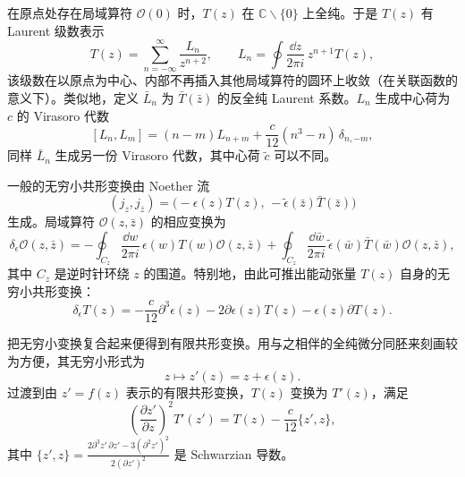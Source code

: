在原点处存在局域算符 $\mathcal{O}(0)$ 时，$T(z)$ 在 $\mathbb{C}\backslash\{0\}$ 上全纯。于是 $T(z)$ 有 Laurent 级数表示
\begin{equation}
  \label{eq:2-2}
  T(z)=\sum_{n=-\infty}^{\infty}\frac{L_n}{z^{n+2}},
  \qquad
  L_n=\oint\frac{\dd z}{2\pi i}\,z^{n+1}T(z),
\end{equation}
该级数在以原点为中心、内部不再插入其他局域算符的圆环上收敛（在关联函数的意义下）。类似地，定义 $\bar L_n$ 为 $\bar T(\bar z)$ 的反全纯 Laurent 系数。$L_n$ 生成中心荷为 $c$ 的 Virasoro 代数
\begin{equation}
  \label{eq:2-3}
  [L_n,L_m]=(n-m)L_{n+m}+\frac{c}{12}(n^3-n)\,\delta_{n,-m},
\end{equation}
同样 $\bar L_n$ 生成另一份 Virasoro 代数，其中心荷 $\tilde c$ 可以不同。


一般的无穷小共形变换由 Noether 流
\begin{equation}
  \label{eq:2-4}
  (j_z,j_{\bar z})=\bigl(-\epsilon(z)T(z),\,-\tilde\epsilon(\bar z)\bar T(\bar z)\bigr)
\end{equation}
生成。局域算符 $\mathcal{O}(z,\bar z)$ 的相应变换为
\begin{equation}
  \label{eq:2-5}
  \delta_\epsilon\mathcal{O}(z,\bar z)
  =-\oint_{C_z}\frac{\dd w}{2\pi i}\,\epsilon(w)T(w)\mathcal{O}(z,\bar z)
  +\oint_{C_z}\frac{\dd\bar w}{2\pi i}\,\tilde\epsilon(\bar w)\bar T(\bar w)\mathcal{O}(z,\bar z),
\end{equation}
其中 $C_z$ 是逆时针环绕 $z$ 的围道。特别地，由此可推出能动张量 $T(z)$ 自身的无穷小共形变换：
\begin{equation}
  \label{eq:2-6}
  \delta_\epsilon T(z)=-\frac{c}{12}\partial^3\epsilon(z)-2\partial\epsilon(z)T(z)-\epsilon(z)\partial T(z).
\end{equation}


把无穷小变换复合起来便得到有限共形变换。用与之相伴的全纯微分同胚来刻画较为方便，其无穷小形式为
\begin{equation}
  \label{eq:2-7}
  z\mapsto z'(z)=z+\epsilon(z).
\end{equation}
过渡到由 $z'=f(z)$ 表示的有限共形变换，$T(z)$ 变换为 $T'(z)$，满足
\begin{equation}
  \label{eq:2-8}
  \left(\frac{\partial z'}{\partial z}\right)^{2}T'(z')=T(z)-\frac{c}{12}\{z',z\},
\end{equation}
其中
$\displaystyle \{z',z\}=\frac{2\partial^3 z'\,\partial z'-3(\partial^2 z')^2}{2(\partial z')^2}$
是 Schwarzian 导数。

